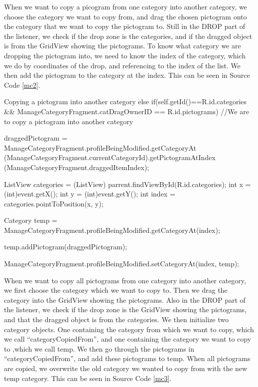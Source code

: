 When we want to copy a picogram from one category into another category, we choose the category we want to copy from, and drag the chosen pictogram onto the category that we want to copy the pictogram to. 
Still in the DROP part of the listener, we check if the drop zone is the categories, and if the dragged object is from the GridView showing the pictograms.
To know what category we are dropping the pictogram into, we need to know the index of the category, which we do by coordinates of the drop, and referencing to the index of the list.
We then add the pictogram to the category at the index.
This can be seen in Source Code \ref{mc2}.


\begin{source}[{mc2}]{Copying a pictogram into another category}
else if(self.getId()==R.id.categories && ManageCategoryFragment.catDragOwnerID == R.id.pictograms) //We are to copy a pictogram into another category
				{
					
					draggedPictogram = ManageCategoryFragment.profileBeingModified.getCategoryAt
						(ManageCategoryFragment.currentCategoryId).getPictogramAtIndex
						(ManageCategoryFragment.draggedItemIndex); 
							
					ListView categories = (ListView) parrent.findViewById(R.id.categories);
					int x = (int)event.getX();
					int y = (int)event.getY();
					int index = categories.pointToPosition(x, y);
					
					Category temp = ManageCategoryFragment.profileBeingModified.getCategoryAt(index);
					
					temp.addPictogram(draggedPictogram);
				
					ManageCategoryFragment.profileBeingModified.setCategoryAt(index, temp);
										
				}
\end{source}
When we want to copy all pictograms from one category into another category, we first choose the category which we want to copy to. 
Then we drag the category into the GridView showing the pictograms. 
Also in the DROP part of the listener, we check if the drop zone is the GridView showing the pictograms, and that the dragged object is from the categories.
We then initialize two category objects. 
One containing the category from which we want to copy, which we call ``categoryCopiedFrom'', and one containing the category we want to copy to ,which we call temp. 
We then go through the pictograms in ``categoryCopiedFrom'', and add these pictograms to temp. 
When all pictograms are copied, we overwrite the old category we wanted to copy from with the new temp category. 
This can be seen in Source Code \ref{mc3}.

